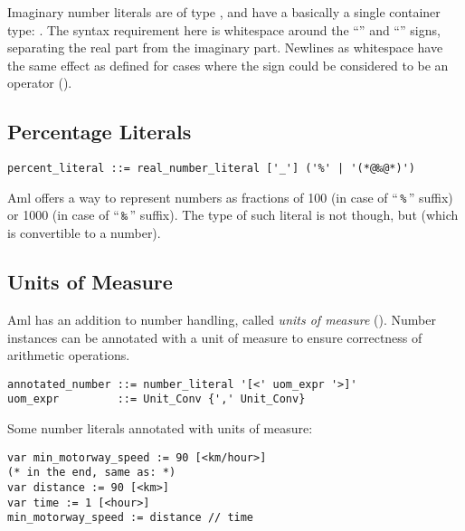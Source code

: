 Imaginary number literals are of type , and have a basically a single container type: . The syntax requirement here is whitespace around the ``\code{+}'' and ``\code{-}'' signs, separating the real part from the imaginary part. Newlines as whitespace have the same effect as defined for cases where the sign could be considered to be an operator ().





\subsection{Percentage Literals}
\label{sec:percentageliterals}

\syntax\begin{lstlisting}
percent_literal ::= real_number_literal ['_'] ('%' | '(*@‰@*)')
\end{lstlisting}

Aml offers a way to represent numbers as fractions of 100 (in case of ``\,\lstinline!%!\,'' suffix) or 1000 (in case of ``\,\texttt{‰}\,'' suffix). The type of such literal is not  though, but  (which is convertible to a number). 





\subsection{Units of Measure}
\label{sec:unitsofmeasuresyntax}

Aml has an addition to number handling, called {\em units of measure} (). Number instances can be annotated with a unit of measure to ensure correctness of arithmetic operations. 

\syntax\begin{lstlisting}
annotated_number ::= number_literal '[<' uom_expr '>]'
uom_expr         ::= Unit_Conv {',' Unit_Conv}
\end{lstlisting}

\example Some number literals annotated with units of measure:
\begin{lstlisting}
var min_motorway_speed := 90 [<km/hour>]
(* in the end, same as: *)
var distance := 90 [<km>]
var time := 1 [<hour>]
min_motorway_speed := distance // time
\end{lstlisting}






